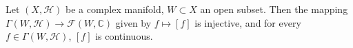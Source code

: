 Let $(X, \mathcal{H})$ be a complex manifold, $W \subset X$ an open subset. Then the mapping $\Gamma(W, \mathcal{H}) \to \mathcal{F}(W, \mathbb{C})$ given by $f \mapsto [f]$ is injective, and for every $f \in \Gamma(W, \mathcal{H})$, $[f]$ is continuous.
